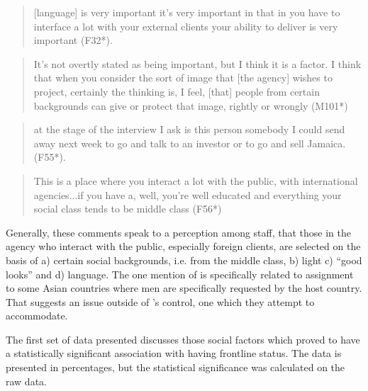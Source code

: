 \begin{quote}
	[language] is very important it’s very important in that in  you have to interface a lot with your external clients your ability to deliver is very important (F32*).
\end{quote}

\begin{quote}
	It's not overtly stated as being important, but I think it is a factor.  I think that when you consider the sort of image that [the agency] wishes to project, certainly the thinking is, I feel, [that] people from certain backgrounds can give or protect that image, rightly or wrongly (M101*)
\end{quote}

\begin{quote}
	at the stage of the interview I ask is this person somebody I could send away next week to go and talk to an investor or to go and sell Jamaica. (F55*).
\end{quote}

\begin{quote}
	This is a place where you interact a lot with the public, with international agencies...if you have a, well, you’re well educated and everything your social class tends to be middle class (F56*)
\end{quote}

Generally, these comments speak to a perception among staff, that those in the agency who interact with the public, especially foreign clients, are selected on the basis of a) certain social backgrounds, i.e. from the middle class, b) light  c) “good looks” and d) language.  The one mention of  is specifically related to assignment to some Asian countries where men are specifically requested by the host country.  That suggests an issue outside of ’s control, one which they attempt to accommodate. 

The first set of data presented discusses those social factors which proved to have a statistically significant association with having frontline status.  The data is presented in percentages, but the statistical significance was calculated on the raw data.  

